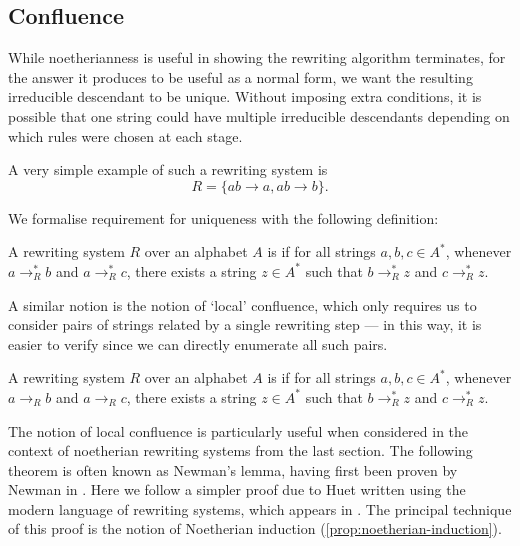 \documentclass[noindex,noinsetproof,emphthm,12pt]{lmaths}
\begin{document}
\subsection{Confluence}

While noetherianness is useful in showing the rewriting algorithm terminates, for the answer it produces to be useful as a normal form, we want the resulting irreducible descendant to be unique. Without imposing extra conditions, it is possible that one string could have multiple irreducible descendants depending on which rules were chosen at each stage.

\begin{example}
	A very simple example of such a rewriting system is
		\[ R = \{ ab \to a, ab \to b \}. \]
\end{example}

We formalise requirement for uniqueness with the following definition:

\begin{defn}
	A rewriting system $R$ over an alphabet $A$ is  if for all strings $a, b, c \in A^*$, whenever $a \to_R^* b$ and $a \to_R^* c$, there exists a string $z \in A^*$ such that $b \to^*_R z$ and $c \to^*_R z$.
\end{defn}

A similar notion is the notion of `local' confluence, which only requires us to consider pairs of strings related by a single rewriting step --- in this way, it is easier to verify since we can directly enumerate all such pairs.

\begin{defn}
	A rewriting system $R$ over an alphabet $A$ is  if for all strings $a, b, c \in A^*$, whenever $a \to_R b$ and $a \to_R c$, there exists a string $z \in A^*$ such that $b \to^*_R z$ and $c \to^*_R z$.
\end{defn}

The notion of local confluence is particularly useful when considered in the context of noetherian rewriting systems from the last section. The following theorem is often known as Newman's lemma, having first been proven by Newman in \cite{Newman1942}. Here we follow a simpler proof due to Huet written using the modern language of rewriting systems, which appears in \cite{Huet1980}. The principal technique of this proof is the notion of Noetherian induction (\cref{prop:noetherian-induction}).
\end{document}
